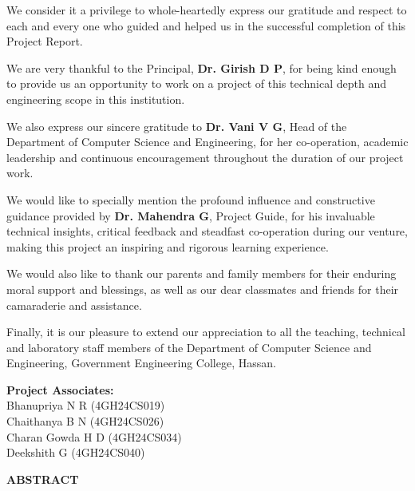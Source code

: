 \documentclass[12pt,a4paper]{report}
\begin{document}
We consider it a privilege to whole-heartedly express our gratitude and respect to each and every one who guided and helped us in the successful completion of this Project Report.

We are very thankful to the Principal, \textbf{Dr. Girish D P}, for being kind enough to provide us an opportunity to work on a project of this technical depth and engineering scope in this institution.

We also express our sincere gratitude to \textbf{Dr. Vani V G}, Head of the Department of Computer Science and Engineering, for her co-operation, academic leadership and continuous encouragement throughout the duration of our project work.

We would like to specially mention the profound influence and constructive guidance provided by \textbf{Dr. Mahendra G}, Project Guide, for his invaluable technical insights, critical feedback and steadfast co-operation during our venture, making this project an inspiring and rigorous learning experience.

We would also like to thank our parents and family members for their enduring moral support and blessings, as well as our dear classmates and friends for their camaraderie and assistance.

Finally, it is our pleasure to extend our appreciation to all the teaching, technical and laboratory staff members of the Department of Computer Science and Engineering, Government Engineering College, Hassan.

\vspace{0.8cm}
\hfill \textbf{Project Associates:}\\[0.2cm]
\null \hfill Bhanupriya N R (4GH24CS019)\\
\null \hfill Chaithanya B N (4GH24CS026)\\
\null \hfill Charan Gowda H D (4GH24CS034)\\
\null \hfill Deekshith G (4GH24CS040)
\newpage

\begin{center}
  \textbf{\Large ABSTRACT}\\[0.6cm]
\end{center}
\end{document}
